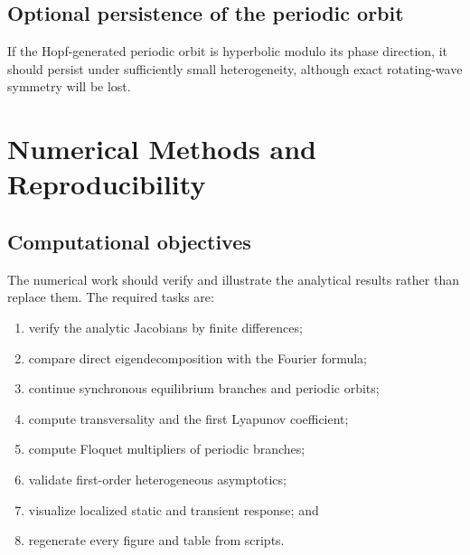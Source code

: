 \documentclass[11pt, reqno]{amsart}
\theoremstyle{definition}
\theoremstyle{remark}
\begin{document}
	
	\subsection{Optional persistence of the periodic orbit}
	
	If the Hopf-generated periodic orbit is hyperbolic modulo its phase direction,
	it should persist under sufficiently small heterogeneity, although exact
	rotating-wave symmetry will be lost.
	
	
	\section{Numerical Methods and Reproducibility}
	\label{sec:numerics}
	
	\subsection{Computational objectives}
	
	The numerical work should verify and illustrate the analytical results rather
	than replace them.  The required tasks are:
	\begin{enumerate}[label=(\roman*),leftmargin=2.5em]
		\item verify the analytic Jacobians by finite differences;
		\item compare direct eigendecomposition with the Fourier formula;
		\item continue synchronous equilibrium branches and periodic orbits;
		\item compute transversality and the first Lyapunov coefficient;
		\item compute Floquet multipliers of periodic branches;
		\item validate first-order heterogeneous asymptotics;
		\item visualize localized static and transient response; and
		\item regenerate every figure and table from scripts.
	\end{enumerate}
	
\end{document}
